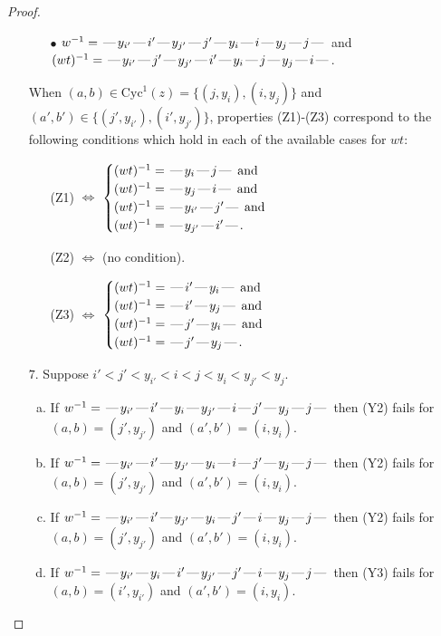\documentclass[10pt]{article}
\theoremstyle{definition}
\theoremstyle{definition}
\def\dash{\text{\hspace{0.5mm}---\hspace{0.5mm}}}
\def\Cyc{\mathrm{Cyc}}
\begin{document}
\begin{proof}
\begin{enumerate}
\begin{enumerate}
\item[$\bullet$] $w^{-1} = \dash y_{i'}\dash i'\dash y_{j'}\dash j'\dash y_i\dash i\dash y_j\dash j\dash $ and $(wt)^{-1} = \dash y_{i'}\dash j'\dash y_{j'}\dash i'\dash y_i\dash j\dash y_j\dash i\dash $.
\end{enumerate}
When $(a,b)\in\Cyc^1(z)=\{(j,y_i),(i,y_j)\}$ and $(a',b')\in\{(j',y_{i'}),(i',y_{j'})\}$,
properties (Z1)-(Z3) correspond to the following conditions which
hold in each of the available cases for $wt$:
\begin{enumerate}
\item[](Z1) $\Leftrightarrow$ $\begin{cases}\text{$(wt)^{-1} = \dash y_i \dash j \dash$}\text{ and }\\
\text{$(wt)^{-1} = \dash y_j \dash i \dash$}\text{ and }\\
\text{$(wt)^{-1} = \dash y_{i'} \dash j' \dash$}\text{ and }\\
\text{$(wt)^{-1} = \dash y_{j'} \dash i' \dash$}.\end{cases}$
\item[](Z2) $\Leftrightarrow$ (no condition).
\item[](Z3) $\Leftrightarrow$ $\begin{cases}\text{$(wt)^{-1} = \dash i' \dash y_i \dash$}\text{ and }\\
\text{$(wt)^{-1} = \dash i' \dash y_j \dash$}\text{ and }\\
\text{$(wt)^{-1} = \dash j' \dash y_i \dash$}\text{ and }\\
\text{$(wt)^{-1} = \dash j' \dash y_j \dash$}.\end{cases}$
\end{enumerate}
\item[$7$.] Suppose $i' < j' < y_{i'} < i < j < y_i < y_{j'} < y_j$.
\begin{enumerate}[(a)]
\item If $w^{-1} = \dash y_{i'}\dash i'\dash y_i\dash y_{j'}\dash i\dash j'\dash y_j\dash j\dash $ then (Y2) fails for $(a,b)=(j',y_{j'})$ and $(a',b')=(i,y_i)$.
\item If $w^{-1} = \dash y_{i'}\dash i'\dash y_{j'}\dash y_i\dash i\dash j'\dash y_j\dash j\dash $ then (Y2) fails for $(a,b)=(j',y_{j'})$ and $(a',b')=(i,y_i)$.
\item If $w^{-1} = \dash y_{i'}\dash i'\dash y_{j'}\dash y_i\dash j'\dash i\dash y_j\dash j\dash $ then (Y2) fails for $(a,b)=(j',y_{j'})$ and $(a',b')=(i,y_i)$.
\item If $w^{-1} = \dash y_{i'}\dash y_i\dash i'\dash y_{j'}\dash j'\dash i\dash y_j\dash j\dash $ then (Y3) fails for $(a,b)=(i',y_{i'})$ and $(a',b')=(i,y_i)$.

\end{enumerate}
\end{enumerate}
\end{proof}
\end{document}

